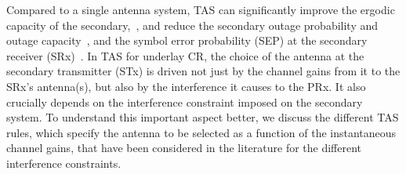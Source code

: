 \documentclass[12pt,draftcls,peerreview,onecolumn]{IEEEtran}
\begin{document}
Compared to a single antenna system, TAS can significantly improve the ergodic capacity of the secondary,~\cite{Hanif_2015_globecom,Wang_2010_TWC}, and reduce the secondary outage probability and outage capacity~\cite{Kong_2011_JCN}, and the symbol error probability (SEP) at the secondary receiver (SRx)~\cite{Sarvendranath_2013_TCOM}. In TAS for underlay CR, the choice of the antenna at the secondary transmitter (STx) is driven not just by the channel gains from it to the SRx's antenna(s), but also by the interference it causes to the PRx. It also crucially depends on the interference constraint imposed on the secondary system. To understand this important aspect better, we discuss the different TAS rules, which specify the antenna to be selected as a function of the instantaneous channel gains, that have been considered in the literature for the different interference constraints. 
%
\end{document}
